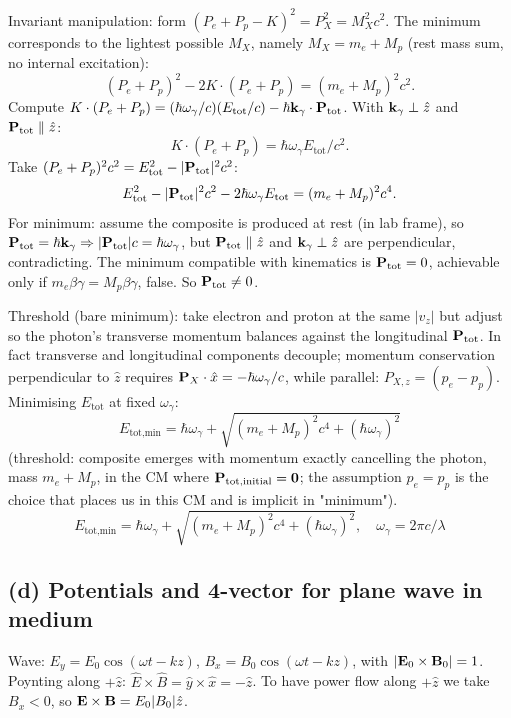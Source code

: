 \documentclass[11pt]{article}
\begin{document}
Invariant manipulation: form $(P_e+P_p - K)^2 = P_X^2 = M_X^2 c^2$. The minimum corresponds to the lightest possible $M_X$, namely $M_X = m_e + M_p$ (rest mass sum, no internal excitation):
\[ (P_e+P_p)^2 - 2 K\cdot(P_e+P_p) = (m_e+M_p)^2 c^2. \]
Compute $K\cdot(P_e+P_p) = (\hbar\omega_\gamma/c)(E_\text{tot}/c) - \hbar\vb k_\gamma\cdot\vb P_\text{tot}$. With $\vb k_\gamma\perp\hat z$ and $\vb P_\text{tot}\parallel\hat z$:
\[ K\cdot(P_e+P_p) = \hbar\omega_\gamma E_\text{tot}/c^2. \]
Take $(P_e+P_p)^2 c^2 = E_\text{tot}^2 - |\vb P_\text{tot}|^2 c^2$:
\[ E_\text{tot}^2 - |\vb P_\text{tot}|^2 c^2 - 2\hbar\omega_\gamma E_\text{tot} = (m_e+M_p)^2 c^4. \]
For minimum: assume the composite is produced at rest (in lab frame), so $\vb P_\text{tot} = \hbar\vb k_\gamma\Rightarrow|\vb P_\text{tot}|c = \hbar\omega_\gamma$, but $\vb P_\text{tot}\parallel\hat z$ and $\vb k_\gamma\perp\hat z$ are perpendicular, contradicting. The minimum compatible with kinematics is $\vb P_\text{tot} = 0$, achievable only if $m_e\beta\gamma = M_p\beta\gamma$, false. So $\vb P_\text{tot}\neq 0$.

Threshold (bare minimum): take electron and proton at the same $|v_z|$ but adjust so the photon's transverse momentum balances against the longitudinal $\vb P_\text{tot}$. In fact transverse and longitudinal components decouple; momentum conservation perpendicular to $\hat z$ requires $\vb P_X\cdot\hat x = -\hbar\omega_\gamma/c$, while parallel: $P_{X,z} = (p_e - p_p)$. Minimising $E_\text{tot}$ at fixed $\omega_\gamma$:
\[ E_\text{tot,min} = \hbar\omega_\gamma + \sqrt{(m_e+M_p)^2 c^4 + (\hbar\omega_\gamma)^2} \]
(threshold: composite emerges with momentum exactly cancelling the photon, mass $m_e+M_p$, in the CM where $\vb P_\text{tot,initial} = \vb 0$; the assumption $p_e = p_p$ is the choice that places us in this CM and is implicit in "minimum").
\[ \boxed{\;E_\text{tot,min} = \hbar\omega_\gamma + \sqrt{(m_e+M_p)^2 c^4 + (\hbar\omega_\gamma)^2},\quad \omega_\gamma = 2\pi c/\lambda\;} \]

\subsection*{(d) Potentials and 4-vector for plane wave in medium}

Wave: $E_y = E_0\cos(\omega t - k z)$, $B_x = B_0\cos(\omega t - kz)$, with $|\vb E_0\times\vb B_0|=1$. Poynting along $+\hat z$: $\hat E\times\hat B = \hat y\times\hat x = -\hat z$. To have power flow along $+\hat z$ we take $B_x<0$, so $\vb E\times\vb B = E_0|B_0|\hat z$.
\end{document}
